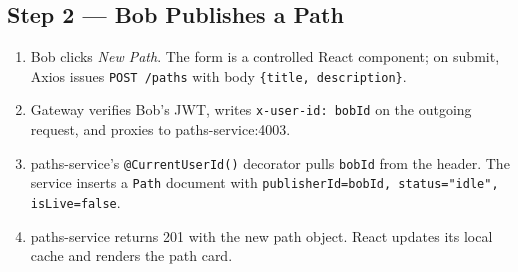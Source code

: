 \documentclass[11pt,a4paper]{article}
\begin{document}
\subsection{Step 2 — Bob Publishes a Path}
\begin{enumerate}[leftmargin=*]
  \item Bob clicks \emph{New Path}.  The form is a controlled React
        component; on submit, Axios issues
        \texttt{POST /paths} with body
        \texttt{\{title, description\}}.
  \item Gateway verifies Bob's JWT, writes
        \texttt{x-user-id: bobId} on the outgoing request, and
        proxies to paths-service:4003.
  \item paths-service's \texttt{@CurrentUserId()} decorator pulls
        \texttt{bobId} from the header.  The service inserts a
        \texttt{Path} document with
        \texttt{publisherId=bobId, status="idle", isLive=false}.
  \item paths-service returns 201 with the new path object.  React
        updates its local cache and renders the path card.
\end{enumerate}
\end{document}
